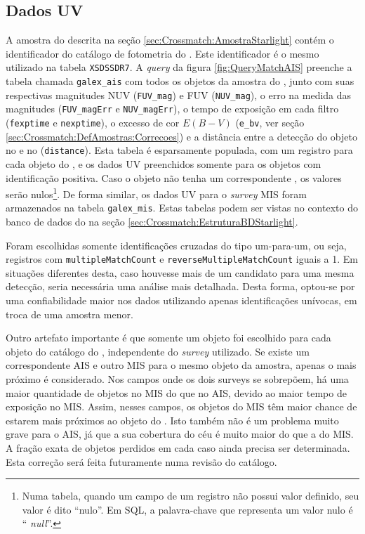 \subsection{Dados UV}

A amostra do \starlight descrita na seção \ref{sec:Crossmatch:AmostraStarlight}
contém o identificador do catálogo de fotometria do \SDSS. Este identificador é
o mesmo utilizado na tabela \texttt{XSDSSDR7}. A {\em query} da figura
\ref{fig:QueryMatchAIS} preenche a tabela chamada \texttt{galex\_ais} com todos
os objetos da amostra do \starlight, junto com suas respectivas magnitudes NUV
(\texttt{FUV\_mag}) e FUV (\texttt{NUV\_mag}), o erro na medida das magnitudes
({\tt FUV\_magErr} e \texttt{NUV\_magErr}), o tempo de exposição em cada filtro
({\tt fexptime} e \texttt{nexptime}), o excesso de cor $E(B-V)$ (\texttt{e\_bv},
ver seção \ref{sec:Crossmatch:DefAmostras:Correcoes}) e a distância entre a
detecção do objeto no \galex e no \SDSS (\texttt{distance}). Esta tabela é
esparsamente populada, com um registro para cada objeto do \starlight, e os
dados UV preenchidos somente para os objetos com identificação positiva. Caso o
objeto não tenha um correspondente \galex, os valores serão nulos\footnote{Numa
tabela, quando um campo de um registro não possui valor definido, seu valor é
dito ``nulo''. Em SQL, a palavra-chave que representa um valor nulo é ``{\em
null}''.}. De forma similar, os dados UV para o {\em survey} MIS foram
armazenados na tabela \texttt{galex\_mis}. Estas tabelas podem ser vistas no
contexto do banco de dados do \starlight na seção
\ref{sec:Crossmatch:EstruturaBDStarlight}.

Foram escolhidas somente identificações cruzadas do tipo um-para-um, ou seja,
registros com \texttt{multipleMatchCount} e \texttt{reverseMultipleMatchCount}
iguais a 1. Em situações diferentes desta, caso houvesse mais de um candidato
para uma mesma detecção, seria necessária uma análise mais detalhada. Desta
forma, optou-se por uma confiabilidade maior nos dados utilizando apenas
identificações unívocas, em troca de uma amostra menor.

Outro artefato importante é que somente um objeto \galex foi escolhido para cada
objeto do catálogo do \starlight, independente do {\em survey} utilizado. Se
existe um correspondente AIS e outro MIS para o mesmo objeto da amostra, apenas
o mais próximo é considerado. Nos campos onde os dois {surveys} se sobrepõem, há
uma maior quantidade de objetos no MIS do que no AIS, devido ao maior tempo de
exposição no MIS. Assim, nesses campos, os objetos do MIS têm maior chance de
estarem mais próximos ao objeto do \SDSS. Isto também não é um problema muito
grave para o AIS, já que a sua cobertura do céu é muito maior do que a do MIS. A
fração exata de objetos perdidos em cada caso ainda precisa ser determinada.
Esta correção será feita futuramente numa revisão do catálogo.

